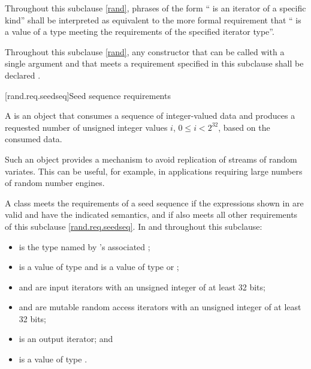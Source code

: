 \pnum
Throughout this subclause \ref{rand},
phrases of the form `` is an iterator of a specific kind''
shall be interpreted as equivalent to the more formal requirement that
`` is a value
of a type meeting the requirements
of the specified iterator type''.

\pnum
Throughout this subclause \ref{rand},
any constructor that can be called with a single argument
and that meets a requirement specified in this subclause
shall be declared .


[rand.req.seedseq]{Seed sequence requirements}%
%

\pnum
 A 
 is an object
 that consumes a sequence
 of integer-valued data
 and produces a requested number
 of unsigned integer values $i$, $0 \le i < 2^{32}$,
 based on the consumed data.
\begin{note}
 Such an object provides a mechanism
 to avoid replication of streams of random variates.
 This can be useful, for example, in applications
 requiring large numbers of random number engines.
\end{note}

\pnum
A class 
meets the requirements
of a seed sequence
if the expressions shown
in 
are valid and have the indicated semantics,
and if  also meets all other requirements
of this subclause \ref{rand.req.seedseq}.
In  and throughout this subclause:
\begin{itemize}
  \item
     is the type named by
    's associated ;
  \item
     is a value of type 
    and
     is a value of type  or ;
  \item
     and  are input iterators
    with an unsigned integer  of at least 32 bits;
  \item
     and  are mutable random access iterators
    with an unsigned integer  of at least 32 bits;
  \item
     is an output iterator;
  and
  \item
     is a value of type .
\end{itemize}


